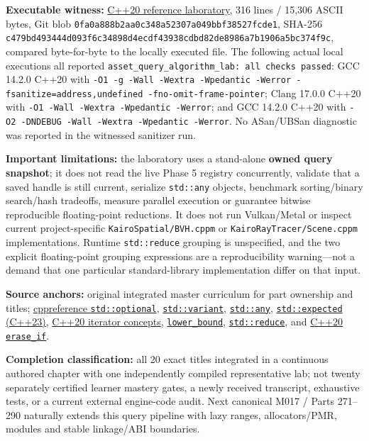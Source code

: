 \textbf{Executable witness:} \href{tools/labs/asset_query_algorithm_lab.cpp}{C++20 reference laboratory}, 316 lines / 15,306 ASCII bytes, Git blob \texttt{0fa0a888b2aa0c348a52307a049bbf38527fcde1}, SHA-256 \texttt{c479bd493444d093f6c34898d4ecdf43938cdbd82de8986a7b1906a5bc374f9c}, compared byte-for-byte to the locally executed file. The following actual local executions all reported \texttt{asset\_query\_algorithm\_lab:\ all\ checks\ passed}: GCC 14.2.0 C++20 with \texttt{-O1\ -g\ -Wall\ -Wextra\ -Wpedantic\ -Werror\ -fsanitize=address,undefined\ -fno-omit-frame-pointer}; Clang 17.0.0 C++20 with \texttt{-O1\ -Wall\ -Wextra\ -Wpedantic\ -Werror}; and GCC 14.2.0 C++20 with \texttt{-O2\ -DNDEBUG\ -Wall\ -Wextra\ -Wpedantic\ -Werror}. No ASan/UBSan diagnostic was reported in the witnessed sanitizer run.

\textbf{Important limitations:} the laboratory uses a stand-alone \textbf{owned query snapshot}; it does not read the live Phase 5 registry concurrently, validate that a saved handle is still current, serialize \texttt{std::any} objects, benchmark sorting/binary search/hash tradeoffs, measure parallel execution or guarantee bitwise reproducible floating-point reductions. It does not run Vulkan/Metal or inspect current project-specific \texttt{KairoSpatial/BVH.cppm} or \texttt{KairoRayTracer/Scene.cppm} implementations. Runtime \texttt{std::reduce} grouping is unspecified, and the two explicit floating-point grouping expressions are a reproducibility warning---not a demand that one particular standard-library implementation differ on that input.

\textbf{Source anchors:} original integrated master curriculum for part ownership and titles; \href{https://en.cppreference.com/w/cpp/utility/optional}{cppreference \texttt{std::optional}}, \href{https://en.cppreference.com/w/cpp/utility/variant}{\texttt{std::variant}}, \href{https://en.cppreference.com/w/cpp/utility/any}{\texttt{std::any}}, \href{https://en.cppreference.com/w/cpp/utility/expected}{\texttt{std::expected} (C++23)}, \href{https://en.cppreference.com/w/cpp/iterator}{C++20 iterator concepts}, \href{https://en.cppreference.com/w/cpp/algorithm/lower_bound}{\texttt{lower\_bound}}, \href{https://en.cppreference.com/cpp/algorithm/reduce}{\texttt{std::reduce}}, and \href{https://en.cppreference.com/cpp/container/unordered_map/erase_if}{C++20 \texttt{erase\_if}}.

\textbf{Completion classification:} all 20 exact titles integrated in a continuous authored chapter with one independently compiled representative lab; not twenty separately certified learner mastery gates, a newly received transcript, exhaustive tests, or a current external engine-code audit. Next canonical M017 / Parts 271--290 naturally extends this query pipeline with lazy ranges, allocators/PMR, modules and stable linkage/ABI boundaries.

